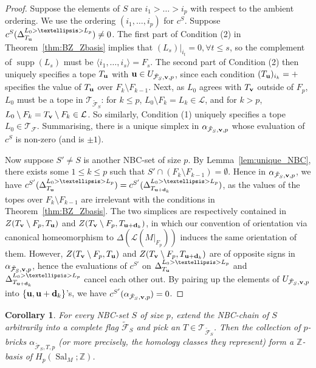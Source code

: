 \documentclass{amsart}
\newtheorem{corollary}[theorem]{Corollary}
\newcommand\Fcal{{\mathcal F}}
\newcommand\Lcal{{\mathcal L}}
\newcommand\Tcal{{\mathcal T}}
\newcommand\dd{{\bf d}}
\newcommand\uu{{\bf u}}
\newcommand\vv{{\bf v}}
\newcommand\ZZ{{\mathbb Z}}
\DeclareMathOperator{\supp}{supp}
\DeclareMathOperator{\Sal}{Sal}
\begin{document}
{\begin{proof}
Suppose the elements of $S$ are $i_1>\ldots>i_p$ with respect to the ambient ordering.
We use the ordering $(i_1,\ldots,i_p)$ for $c^S$.
Suppose $c^S(\Delta_{T_{\bf u}}^{L_0>\ldots>L_p})\neq 0$.
The first part of Condition (2) in Theorem~\ref{thm:BZ_Zbasis} implies that $(L_s)|_{i_t}=0,\forall t\leq s$, so the complement of $\supp(L_s)$ must be $\langle i_1,\ldots,i_s\rangle=F_s$.
The second part of Condition (2) then uniquely specifies a tope $T_{\bf u}$ with ${\bf u}\in U_{\tilde{\Fcal}_S,\vv,p}$, since each condition $(T_{\bf u})_{i_k}=+$ specifies the value of $T_{\uu}$ over $F_k\setminus F_{k-1}$.
Next, as $L_0$ agrees with $T_{\vv}$ outside of $F_p$, $L_0$ must be a tope in $\Tcal_{\tilde{\Fcal}_S}$: for $k\leq p$, $L_0\setminus F_k=L_k\in\Lcal$, and for $k>p$, $L_0\setminus F_k=T_{\vv}\setminus F_k\in\Lcal$.
So similarly, Condition (1) uniquely specifies a tope $L_0\in\Tcal_\Fcal$.
Summarising, there is a unique simplex in $\alpha_{\tilde{\Fcal}_S,\vv,p}$ whose evaluation of $c^S$ is non-zero (and is $\pm 1$).

Now suppose $S'\neq S$ is another NBC-set of size $p$.
By Lemma~\ref{lem:unique_NBC}, there exists some $1\leq k\leq p$ such that $S'\cap (F_k\setminus F_{k-1})=\emptyset$.
Hence in $\alpha_{\tilde{\Fcal}_S,\vv,p}$, we have $c^{S'}(\Delta_{T_{\uu}}^{L_0>\ldots>L_p})=c^{S'}(\Delta_{T_{\uu+\dd_k}}^{L_0>\ldots>L_p})$, as the values of the topes over $F_k\setminus F_{k-1}$ are irrelevant with the conditions in Theorem~\ref{thm:BZ_Zbasis}. The two simplices are respectively contained in $Z(T_{\vv}\setminus F_p,T_{\uu})$ and $Z(T_{\vv}\setminus F_p,T_{\uu+\dd_k})$, in which our convention of orientation via canonical homeomorphism to $\Delta(\Lcal(M|_{F_p}))$ induces the same orientation of them.
However, $Z(T_{\vv}\setminus F_p,T_{\uu})$ and $Z(T_{\vv}\setminus F_p,T_{\uu+\dd_k})$ are of opposite signs in $\alpha_{\tilde{\Fcal}_S,\vv,p}$, hence the evaluations of $c^{S'}$ on $\Delta_{T_{\uu}}^{L_0>\ldots>L_p}$ and $\Delta_{T_{\uu+\dd_k}}^{L_0>\ldots>L_p}$ cancel each other out.
By pairing up the elements of $U_{\tilde{\Fcal}_S,\vv,p}$ into $\{{\bf u}, {\bf u}+\dd_k\}$'s, we have $c^{S'}(\alpha_{\tilde{\Fcal}_S,\vv,p})=0$.
\end{proof}

\begin{corollary} \label{coro:NBC_Hp_basis}
For every NBC-set $S$ of size $p$, extend the NBC-chain of $S$ arbitrarily into a complete flag $\tilde{\Fcal}_S$ and pick an $T\in\Tcal_{\tilde{\Fcal}_S}$.
Then the collection of $p$-bricks $\alpha_{\tilde{\Fcal}_S,T,p}$ (or more precisely, the homology classes they represent) form a $\ZZ$-basis of $H_p(\Sal_M;\ZZ)$.
\end{corollary}

}
\end{document}
